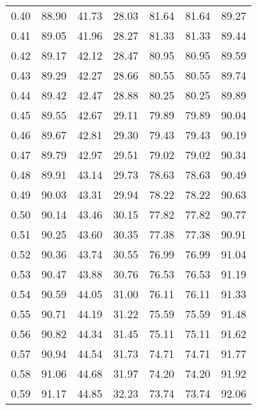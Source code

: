 \begin{tabular}{|c|c|c|c|c|c|c|}
      0.40 &     88.90 &     41.73 &      28.03 &   81.64 &      81.64 &         89.27 \\
      0.41 &     89.05 &     41.96 &      28.27 &   81.33 &      81.33 &         89.44 \\
      0.42 &     89.17 &     42.12 &      28.47 &   80.95 &      80.95 &         89.59 \\
      0.43 &     89.29 &     42.27 &      28.66 &   80.55 &      80.55 &         89.74 \\
      0.44 &     89.42 &     42.47 &      28.88 &   80.25 &      80.25 &         89.89 \\
      0.45 &     89.55 &     42.67 &      29.11 &   79.89 &      79.89 &         90.04 \\
      0.46 &     89.67 &     42.81 &      29.30 &   79.43 &      79.43 &         90.19 \\
      0.47 &     89.79 &     42.97 &      29.51 &   79.02 &      79.02 &         90.34 \\
      0.48 &     89.91 &     43.14 &      29.73 &   78.63 &      78.63 &         90.49 \\
      0.49 &     90.03 &     43.31 &      29.94 &   78.22 &      78.22 &         90.63 \\
      0.50 &     90.14 &     43.46 &      30.15 &   77.82 &      77.82 &         90.77 \\
      0.51 &     90.25 &     43.60 &      30.35 &   77.38 &      77.38 &         90.91 \\
      0.52 &     90.36 &     43.74 &      30.55 &   76.99 &      76.99 &         91.04 \\
      0.53 &     90.47 &     43.88 &      30.76 &   76.53 &      76.53 &         91.19 \\
      0.54 &     90.59 &     44.05 &      31.00 &   76.11 &      76.11 &         91.33 \\
      0.55 &     90.71 &     44.19 &      31.22 &   75.59 &      75.59 &         91.48 \\
      0.56 &     90.82 &     44.34 &      31.45 &   75.11 &      75.11 &         91.62 \\
      0.57 &     90.94 &     44.54 &      31.73 &   74.71 &      74.71 &         91.77 \\
      0.58 &     91.06 &     44.68 &      31.97 &   74.20 &      74.20 &         91.92 \\
      0.59 &     91.17 &     44.85 &      32.23 &   73.74 &      73.74 &         92.06 \\

\end{tabular}
